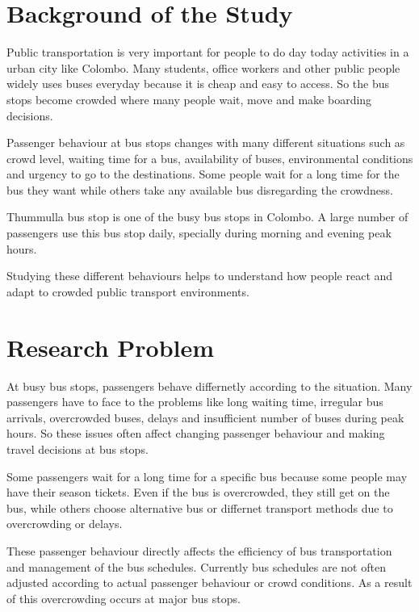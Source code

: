 \documentclass[12pt,a4paper]{report}
\begin{document}
\section{Background of the Study}

Public transportation is very important for people to do day today activities in a urban city like Colombo. Many students, office workers and other public people widely uses buses everyday because it is cheap and easy to access. So the bus stops become crowded where many people wait, move and make boarding decisions.

Passenger behaviour at bus stops changes with many different situations such as crowd level, waiting time for a bus, availability of buses, environmental conditions and urgency to go to the destinations. Some people wait for a long time for the bus they want while others take any available bus disregarding the crowdness.

Thummulla bus stop is one of the busy bus stops in Colombo. A large number of passengers use this bus stop daily, specially during morning and  evening peak hours. 

Studying these different behaviours helps to understand how people react and adapt to crowded public transport environments.


\section{Research Problem}

At busy bus stops, passengers behave differnetly according to the situation. Many passengers have to face to the problems like long waiting time, irregular bus arrivals, overcrowded buses, delays and insufficient number of buses during peak hours. So these issues often affect changing passenger behaviour and making travel decisions at bus stops.

Some passengers wait for a long time for a specific bus because some people may have their season tickets. Even if the bus is overcrowded, they still get on the bus, while others choose alternative bus or differnet transport methods due to overcrowding or delays.

These passenger behaviour directly affects the efficiency of bus transportation and management of the bus schedules.
Currently bus schedules are not often adjusted according to actual passenger behaviour or crowd conditions. As a result of this overcrowding occurs at major bus stops.
\end{document}
